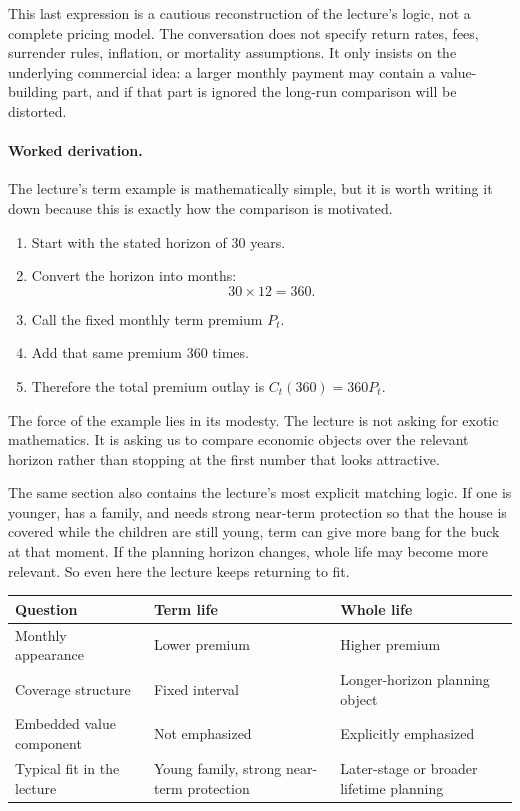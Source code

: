 \begin{remark}
This last expression is a cautious reconstruction of the lecture's logic, not a complete pricing model. The conversation does not specify return rates, fees, surrender rules, inflation, or mortality assumptions. It only insists on the underlying commercial idea: a larger monthly payment may contain a value-building part, and if that part is ignored the long-run comparison will be distorted.
\end{remark}

\paragraph{Worked derivation.} The lecture's term example is mathematically simple, but it is worth writing it down because this is exactly how the comparison is motivated.
\begin{enumerate}
\item Start with the stated horizon of \(30\) years.
\item Convert the horizon into months:
\[
30 \times 12 = 360.
\]
\item Call the fixed monthly term premium \(P_t\).
\item Add that same premium \(360\) times.
\item Therefore the total premium outlay is \(C_t(360) = 360P_t\).
\end{enumerate}

The force of the example lies in its modesty. The lecture is not asking for exotic mathematics. It is asking us to compare economic objects over the relevant horizon rather than stopping at the first number that looks attractive.

The same section also contains the lecture's most explicit matching logic. If one is younger, has a family, and needs strong near-term protection so that the house is covered while the children are still young, term can give more bang for the buck at that moment. If the planning horizon changes, whole life may become more relevant. So even here the lecture keeps returning to fit.

\begin{table}
\centering
\begin{tabular}{|l|l|l|}
\hline
Question & Term life & Whole life \\
\hline
Monthly appearance & Lower premium & Higher premium \\
\hline
Coverage structure & Fixed interval & Longer-horizon planning object \\
\hline
Embedded value component & Not emphasized & Explicitly emphasized \\
\hline
Typical fit in the lecture & Young family, strong near-term protection & Later-stage or broader lifetime planning \\
\hline
\end{tabular}
\end{table}

